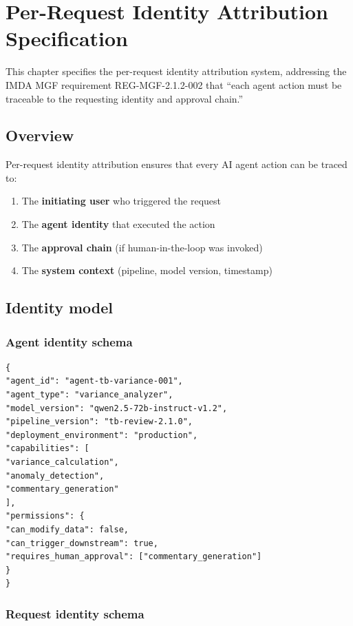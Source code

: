 \documentclass[11pt,a4paper,twoside]{report}
\begin{document}
\chapter{Per-Request Identity Attribution Specification}\label{ch:identity}

This chapter specifies the per-request identity attribution system, addressing
the IMDA MGF requirement REG-MGF-2.1.2-002 that ``each agent action must be
traceable to the requesting identity and approval chain.''

\section{Overview}

Per-request identity attribution ensures that every AI agent action can be
traced to:
\begin{enumerate}
\item The \textbf{initiating user} who triggered the request
\item The \textbf{agent identity} that executed the action
\item The \textbf{approval chain} (if human-in-the-loop was invoked)
\item The \textbf{system context} (pipeline, model version, timestamp)
\end{enumerate}

\section{Identity model}

\subsection{Agent identity schema}

\begin{lstlisting}[basicstyle=\ttfamily\small,caption={Agent identity record schema.}]
{
"agent_id": "agent-tb-variance-001",
"agent_type": "variance_analyzer",
"model_version": "qwen2.5-72b-instruct-v1.2",
"pipeline_version": "tb-review-2.1.0",
"deployment_environment": "production",
"capabilities": [
"variance_calculation",
"anomaly_detection",
"commentary_generation"
],
"permissions": {
"can_modify_data": false,
"can_trigger_downstream": true,
"requires_human_approval": ["commentary_generation"]
}
}
\end{lstlisting}

\subsection{Request identity schema}
\end{document}

